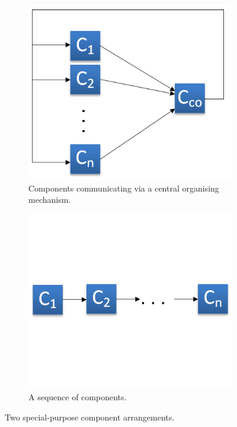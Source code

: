 \begin{figure}[t]
	\centering
	\begin{subfigure}[t]{0.35\textwidth}
		\includegraphics[width=\textwidth]{Figs/c_co.png}
		\caption{Components communicating via a central organising mechanism.}
		\label{fig:centralOrganizer}
	\end{subfigure}
	\begin{subfigure}[t]{0.35\textwidth}
		\includegraphics[width=\textwidth]{Figs/c_sequence.png}
		\caption{A sequence of components.}
		\label{fig:cSequence}
	\end{subfigure}
	\caption{Two special-purpose component arrangements.}
\end{figure}

